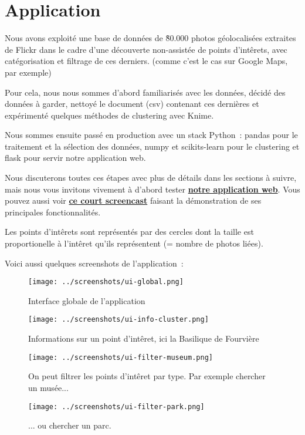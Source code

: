 \chapter{Application}

    Nous avons exploité une base de données de \~80.000 photos géolocalisées extraites de Flickr dans le cadre d'une découverte
    non-assistée de points d'intêrets, avec catégorisation et filtrage de ces derniers. (comme c'est le cas sur Google Maps, par exemple)

    Pour cela, nous nous sommes d'abord familiarisés avec les données, décidé des données à garder, nettoyé le document (csv) contenant ces dernières et expérimenté quelques méthodes de clustering avec Knime.

    Nous sommes ensuite passé en production avec un stack Python~: pandas pour le traitement et la sélection des données, numpy et scikits-learn pour le clustering et flask pour servir notre application web.

    Nous discuterons toutes ces étapes avec plus de détails dans les sections à suivre, mais nous vous invitons vivement à d'abord
    tester \href{http://188.226.171.22/}{\textbf{notre application web}}. Vous pouvez aussi voir \href{http://www.youtube.com/watch?v=SGGsvbjWYY0}{\textbf{ce court screencast}} faisant la démonstration de ses principales fonctionnalités.

    Les points d'intêrets sont représentés par des cercles dont la taille est proportionelle à l'intêret qu'ils représentent (= nombre de photos liées).

    Voici aussi quelques screenshots de l'application~:

    \begin{figure}[H]
        \centering
        \texttt{[image: ../screenshots/ui-global.png]}
        \caption{Interface globale de l'application}
        \label{diagram:ui-global}
    \end{figure}


    \begin{figure}[H]
        \centering
        \texttt{[image: ../screenshots/ui-info-cluster.png]}
        \caption{Informations sur un point d'intêret, ici la Basilique de Fourvière}
        \label{diagram:ui-info-cluster}
    \end{figure}

    \begin{figure}[H]
        \centering
        \texttt{[image: ../screenshots/ui-filter-museum.png]}
        \caption{On peut filtrer les points d'intêret par type. Par exemple chercher un musée...}
        \label{diagram:ui-filter-museum}
    \end{figure}

    \begin{figure}[H]
        \centering
        \texttt{[image: ../screenshots/ui-filter-park.png]}
        \caption{... ou chercher un parc.}
        \label{diagram:ui-filter-park}
    \end{figure}

    \pagebreak

